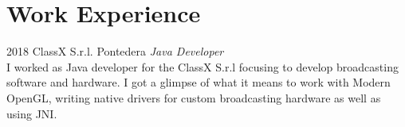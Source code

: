 \documentclass[]{friggeri-cv} %
\begin{document}
\patchcmd{\entry}{14.8cm}{11.8cm}{}{}
\section{Work Experience}
\vspace{-3mm}
\begin{entrylist}
\entry
{2018}
{ClassX S.r.l.}
{Pontedera}
{\emph{Java Developer} \\
I worked as Java developer for the ClassX S.r.l focusing to develop broadcasting software and hardware. I got a glimpse of what it means to work with Modern OpenGL, writing native drivers for custom broadcasting hardware as well as using JNI.}
\end{entrylist}

\clearpage

\end{document}
